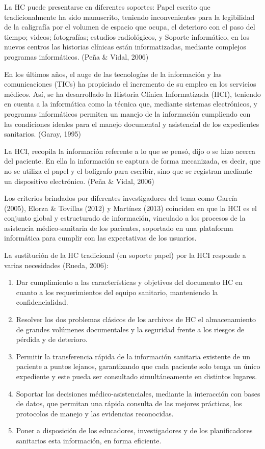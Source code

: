 La HC puede presentarse en diferentes soportes: Papel escrito que tradicionalmente ha sido manuscrito, teniendo inconvenientes para la legibilidad de la caligrafía por el volumen de espacio que ocupa, el deterioro con el paso del tiempo; videos; fotografías; estudios radiológicos, y Soporte informático, en los nuevos centros las historias clínicas están informatizadas, mediante complejos programas informáticos. (Peña \& Vidal, 2006) 

En los últimos años, el auge de las tecnologías de la información y las comunicaciones (TICs) ha propiciado el incremento de su empleo en los servicios médicos. Así, se ha desarrollado la Historia Clínica Informatizada (HCI), teniendo en cuenta a la informática como la técnica que, mediante sistemas electrónicos, y programas informáticos permiten un manejo de la información cumpliendo con las condiciones ideales para el manejo documental y asistencial de los expedientes sanitarios. (Garay, 1995) 

La HCI, recopila la información referente a lo que se pensó, dijo o se hizo acerca del paciente. En ella la información se captura de forma mecanizada, es decir, que no se utiliza el papel y el bolígrafo para escribir, sino que se registran mediante un dispositivo electrónico.  (Peña \& Vidal, 2006) 

Los criterios brindados por diferentes investigadores del tema como García (2005), Elorza \& Tovillas (2012) y Martínez (2013) coinciden en que la HCI es el conjunto global y estructurado de información, vinculado a los procesos de la asistencia médico-sanitaria de los pacientes, soportado en una plataforma informática para cumplir con las expectativas de los usuarios. 

La sustitución de la HC tradicional (en soporte papel) por la HCI responde a varias necesidades  (Rueda, 2006):  

\begin{enumerate}
	\item Dar cumplimiento a las características y objetivos del documento HC en cuanto a los requerimientos del equipo sanitario, manteniendo la confidencialidad.  
	
	\item Resolver los dos problemas clásicos de los archivos de HC el almacenamiento de grandes volúmenes documentales y la seguridad frente a los riesgos de pérdida y de deterioro.  
	
	\item Permitir la transferencia rápida de la información sanitaria existente de un paciente a puntos lejanos, garantizando que cada paciente solo tenga un único expediente y este pueda ser consultado simultáneamente en distintos lugares.  
	
	\item Soportar las decisiones médico-asistenciales, mediante la interacción con bases de datos, que permitan una rápida consulta de las mejores prácticas, los protocolos de manejo y las evidencias reconocidas.  
	
	\item Poner a disposición de los educadores, investigadores y de los planificadores sanitarios esta información, en forma eficiente. 
\end{enumerate}

